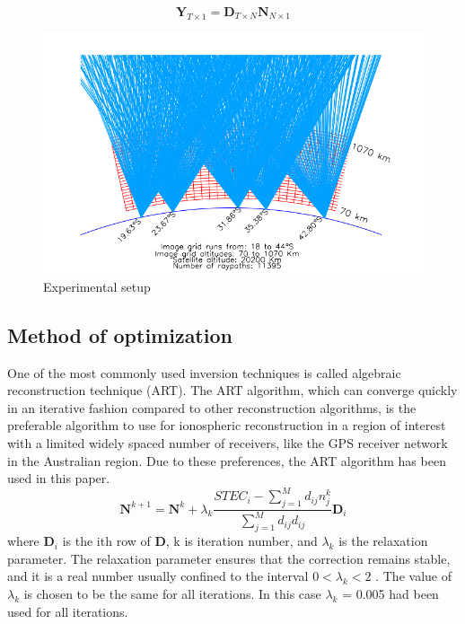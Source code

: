 \documentclass[12pt]{article}
\begin{document}
\begin{equation*}
    \boldsymbol{Y}_{T\times1} = \boldsymbol{D}_{T\times N}\boldsymbol{N}_{N\times1}
\end{equation*}
\begin{figure}[H]
  \centering
  \includegraphics[scale=0.75]{tomo.png}  %
  \caption{Experimental setup}
  \label{fig:1}
\end{figure}
\subsection*{Method of optimization}
One of the most commonly used inversion techniques is called algebraic reconstruction technique (ART). The ART algorithm, which can converge quickly in an iterative fashion compared to other reconstruction algorithms, is the preferable algorithm to use for ionospheric reconstruction in a region of interest with a limited widely spaced number of receivers, like the GPS receiver network in the Australian region. Due to these
preferences, the ART algorithm has been used in this paper.
\begin{equation*}
    \boldsymbol{N}^{k+1} = \boldsymbol{N}^{k} + \lambda_k\frac{STEC_i - \sum_{j=1}^Md_{ij}n_j^k}{\sum_{j=1}^Md_{ij}d_{ij}}\boldsymbol{D}_i
\end{equation*}
where $\boldsymbol{D}_i$ is the ith row of $\boldsymbol{D}$, k is iteration number, and $\lambda_k$ is the relaxation parameter. The relaxation parameter ensures that the correction remains stable, and it is a real number usually confined to the interval $0 < \lambda_k < 2$ . The value of $\lambda_k$ is chosen to be the same for all iterations. In this case $\lambda_k$ = 0.005 had been used for all iterations.
\end{document}
